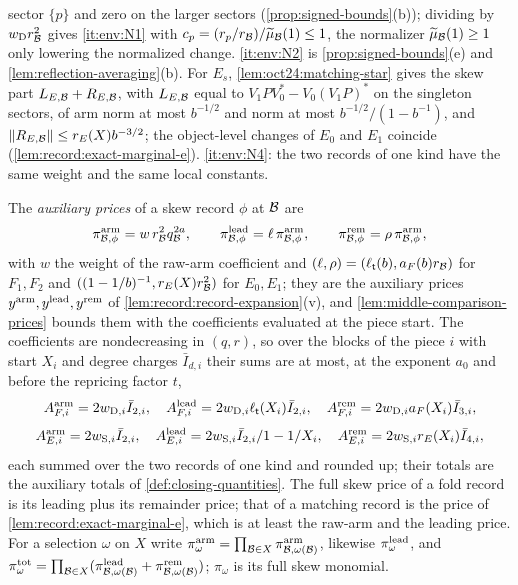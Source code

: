 sector $\{p\}$ and zero on the larger sectors (\cref{prop:signed-bounds}(b)); dividing
by $w_{\rm D}r_\Blk^2$ gives \ref{it:env:N1} with $c_p=(r_p/r_\Blk)/\widetilde\mu_\Blk(1)\le1$,
the normalizer $\widetilde\mu_\Blk(1)\ge1$ only lowering the normalized change.
\ref{it:env:N2} is \cref{prop:signed-bounds}(e) and \cref{lem:reflection-averaging}(b).
For $E_s$, \cref{lem:oct24:matching-star} gives the skew part
$L_{E,\Blk}+R_{E,\Blk}$, with $L_{E,\Blk}$ equal to $V_1PV_0^*-V_0(V_1P)^*$ on the singleton
sectors, of arm norm at most $b^{-1/2}$ and norm at most $b^{-1/2}/(1-b^{-1})$, and
$\|R_{E,\Blk}\|\le r_E(X)b^{-3/2}$; the object-level changes of $E_0$ and $E_1$ coincide
(\cref{lem:record:exact-marginal-e}). \ref{it:env:N4}: the two records of one kind
have the same weight and the same local constants.

The \emph{auxiliary prices} of a skew record $\phi$ at $\Blk$ are
\[
 \pi^{\rm arm}_{\Blk,\phi}=w\,r_\Blk^2q_\Blk^{2a},\qquad
 \pi^{\rm lead}_{\Blk,\phi}=\ell\,\pi^{\rm arm}_{\Blk,\phi},\qquad
 \pi^{\rm rem}_{\Blk,\phi}=\rho\,\pi^{\rm arm}_{\Blk,\phi},
\]
with $w$ the weight of the raw-arm coefficient and $(\ell,\rho)=(\ell_\tlaw(b),a_F(b)r_\Blk)$
for $F_1,F_2$ and $((1-1/b)^{-1},r_E(X)r_\Blk^2)$ for $E_0,E_1$; they are the auxiliary
prices $y^{\rm arm},y^{\rm lead},y^{\rm rem}$ of \cref{lem:record:record-expansion}(v),
and \cref{lem:middle-comparison-prices} bounds them with the coefficients evaluated
at the piece start. The coefficients are nondecreasing in
$(q,r)$, so over the blocks of the piece $i$ with start $X_i$ and degree charges
$\bar I_{d,i}$ their sums are at most, at the exponent $a_0$ and before the repricing
factor $t$,
\[
 A^{\rm arm}_{F,i}=2w_{{\rm D},i}\bar I_{2,i},\quad
 A^{\rm lead}_{F,i}=2w_{{\rm D},i}\ell_\tlaw(X_i)\bar I_{2,i},\quad
 A^{\rm rem}_{F,i}=2w_{{\rm D},i}a_F(X_i)\bar I_{3,i},
\]
\[
 A^{\rm arm}_{E,i}=2w_{{\rm S},i}\bar I_{2,i},\quad
 A^{\rm lead}_{E,i}=\frac{2w_{{\rm S},i}\bar I_{2,i}}{1-1/X_i},\quad
 A^{\rm rem}_{E,i}=2w_{{\rm S},i}r_E(X_i)\bar I_{4,i},
\]
each summed over the two records of one kind and rounded up; their totals are the
auxiliary totals of \cref{def:closing-quantities}. The full skew price of a fold
record is its leading plus its remainder price; that of a matching record is the
price of \cref{lem:record:exact-marginal-e}, which is at least the raw-arm and the
leading price. For a selection $\omega$ on $X$ write $\pi^{\rm arm}_\omega=
\prod_{\Blk\in X}\pi^{\rm arm}_{\Blk,\omega(\Blk)}$, likewise $\pi^{\rm lead}_\omega$, and
$\pi^{\rm tot}_\omega=\prod_{\Blk\in X}(\pi^{\rm lead}_{\Blk,\omega(\Blk)}+\pi^{\rm rem}_{\Blk,\omega(\Blk)})$;
$\pi_\omega$ is its full skew monomial.

